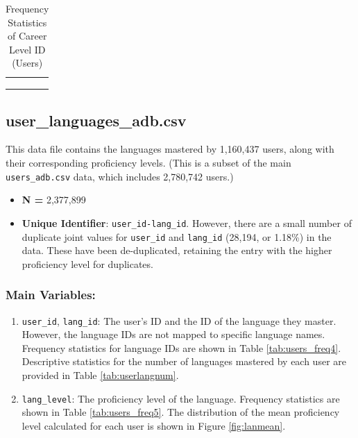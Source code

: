 \documentclass[12pt]{article}
\begin{document}
\begin{table}[]
    \caption{Frequency Statistics of Career Level ID (Users)}
    \centering
    \begin{tabular}{cccc}
\hline
\hline
\vspace{-0.4cm}
\\
 \\
\vspace{-1cm} \\
\hline 
\hline
    \end{tabular}
    \label{tab:users_freq3}
\end{table}






\subsection{user\_languages\_adb.csv}

This data file contains the languages mastered by 1,160,437 users, along with their corresponding proficiency levels. (This is a subset of the main \texttt{users\_adb.csv} data, which includes 2,780,742 users.)

\begin{itemize}
    \item \textbf{N = }2,377,899
    \item \textbf{Unique Identifier}: \texttt{user\_id-lang\_id}. However, there are a small number of duplicate joint values for \texttt{user\_id} and \texttt{lang\_id} (28,194, or 1.18\%) in the data. These have been de-duplicated, retaining the entry with the higher proficiency level for duplicates.
    \end{itemize}
\subsubsection*{\textbf{Main Variables}:}
 
    \begin{enumerate}
        \item \texttt{user\_id}, \texttt{lang\_id}: The user's ID and the ID of the language they master. However, the language IDs are not mapped to specific language names. Frequency statistics for language IDs are shown in Table \ref{tab:users_freq4}. Descriptive statistics for the number of languages mastered by each user are provided in Table \ref{tab:userlangnum}.



        \item \texttt{lang\_level}: The proficiency level of the language. Frequency statistics are shown in Table \ref{tab:users_freq5}. The distribution of the mean proficiency level calculated for each user is shown in Figure \ref{fig:lanmean}.
    \end{enumerate}
\end{document}
